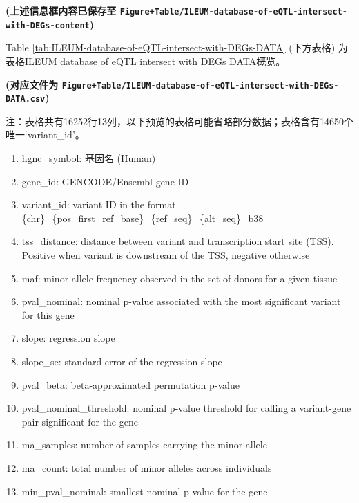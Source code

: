 \documentclass[
]{article}
\providecommand{\tightlist}{%
  \setlength{\itemsep}{0pt}\setlength{\parskip}{0pt}}
\begin{document}
\textbf{(上述信息框内容已保存至 \texttt{Figure+Table/ILEUM-database-of-eQTL-intersect-with-DEGs-content})}

Table \ref{tab:ILEUM-database-of-eQTL-intersect-with-DEGs-DATA} (下方表格) 为表格ILEUM database of eQTL intersect with DEGs DATA概览。

\textbf{(对应文件为 \texttt{Figure+Table/ILEUM-database-of-eQTL-intersect-with-DEGs-DATA.csv})}

\begin{center}\begin{tcolorbox}[colback=gray!10, colframe=gray!50, width=0.9\linewidth, arc=1mm, boxrule=0.5pt]注：表格共有16252行13列，以下预览的表格可能省略部分数据；表格含有14650个唯一`variant\_id'。
\end{tcolorbox}
\end{center}
\begin{center}\begin{tcolorbox}[colback=gray!10, colframe=gray!50, width=0.9\linewidth, arc=1mm, boxrule=0.5pt]\begin{enumerate}\tightlist
\item hgnc\_symbol:  基因名 (Human)
\item gene\_id:  GENCODE/Ensembl gene ID
\item variant\_id:  variant ID in the format \{chr\}\_\{pos\_first\_ref\_base\}\_\{ref\_seq\}\_\{alt\_seq\}\_b38
\item tss\_distance:  distance between variant and transcription start site (TSS). Positive when variant is downstream of the TSS, negative otherwise
\item maf:  minor allele frequency observed in the set of donors for a given tissue
\item pval\_nominal:  nominal p-value associated with the most significant variant for this gene
\item slope:  regression slope
\item slope\_se:  standard error of the regression slope
\item pval\_beta:  beta-approximated permutation p-value
\item pval\_nominal\_threshold:  nominal p-value threshold for calling a variant-gene pair significant for the gene
\item ma\_samples:  number of samples carrying the minor allele
\item ma\_count:  total number of minor alleles across individuals
\item min\_pval\_nominal:  smallest nominal p-value for the gene
\end{enumerate}\end{tcolorbox}
\end{center}
\end{document}
